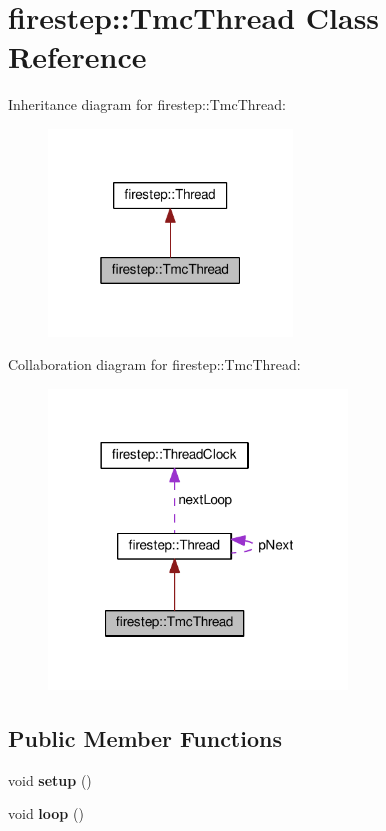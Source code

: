 \hypertarget{classfirestep_1_1_tmc_thread}{\section{firestep\+:\+:Tmc\+Thread Class Reference}
\label{classfirestep_1_1_tmc_thread}
}


Inheritance diagram for firestep\+:\+:Tmc\+Thread\+:
\nopagebreak
\begin{figure}[H]
\begin{center}
\leavevmode
\includegraphics[width=184pt]{classfirestep_1_1_tmc_thread__inherit__graph}
\end{center}
\end{figure}


Collaboration diagram for firestep\+:\+:Tmc\+Thread\+:
\nopagebreak
\begin{figure}[H]
\begin{center}
\leavevmode
\includegraphics[width=225pt]{classfirestep_1_1_tmc_thread__coll__graph}
\end{center}
\end{figure}
\subsection*{Public Member Functions}
\begin{DoxyCompactItemize}
\item 
\hypertarget{classfirestep_1_1_tmc_thread_aa6f36b40da306eb2d9050ceae13b432f}{void {\bfseries setup} ()}\label{classfirestep_1_1_tmc_thread_aa6f36b40da306eb2d9050ceae13b432f}

\item 
\hypertarget{classfirestep_1_1_tmc_thread_a6036f09286e1429ec41bbb04b86f7c21}{void {\bfseries loop} ()}\label{classfirestep_1_1_tmc_thread_a6036f09286e1429ec41bbb04b86f7c21}

\end{DoxyCompactItemize}
